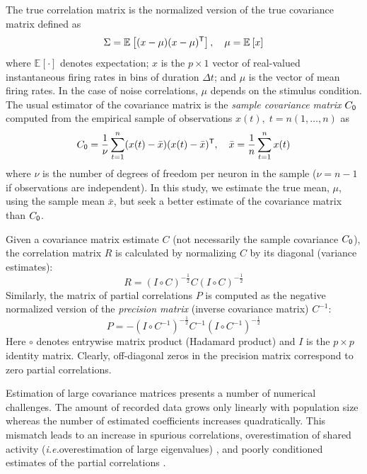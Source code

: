 \documentclass[10pt]{article}
\newcommand{\T}{{\sf T}}
\newcommand{\E}[2][]{\mathbb E_{#1}\left[ #2\right]}    %
\begin{document}
The true correlation matrix is the normalized version of the true covariance matrix defined as
\begin{equation}\label{eq:true-covariance}
    \Sigma = \E{(x-\mu)(x-\mu)^\T},\quad \mu = \E{x}
\end{equation}
where $\E{\cdot}$ denotes expectation; $x$ is the $p\times 1$ vector of real-valued instantaneous firing rates in bins of duration $\Delta t$; and $\mu$ is the vector of mean firing rates. In the case of noise correlations, $\mu$ depends on the stimulus condition.  The usual estimator of the covariance matrix is the \emph{sample covariance matrix} $C_{\sf 0}$ computed from the empirical sample of observations $x(t),\; t=n(1,\ldots,n)$ as
\begin{equation}
    C_{\sf 0} = \frac 1 \nu \sum\limits_{t=1}^n (x(t)-\bar x)(x(t)-\bar x)^\T,\quad \bar x= \frac 1 n \sum\limits_{t=1}^n x(t)
\end{equation}
where $\nu$ is the number of degrees of freedom per neuron in the sample ($\nu=n-1$ if observations are independent). In this study, we estimate the true mean, $\mu$,  using the sample mean $\bar x$, but seek a better estimate of the covariance matrix than $C_{\sf 0}$.

Given a covariance matrix estimate $C$ (not necessarily the sample covariance $C_{\sf 0}$), the correlation matrix $R$ is calculated by normalizing $C$ by its diagonal (variance estimates):
\begin{equation}\label{eq:precision}
    R = \left(I\circ C\right)^{-\frac 1 2} C \left(I\circ C\right)^{-\frac 1 2}
\end{equation}
Similarly, the matrix of partial correlations $P$ is computed as the negative normalized version of the \emph{precision matrix} (inverse covariance matrix) $C^{-1}$:
\begin{equation}\label{eq:partial}
    P = -\left(I\circ C^{-1}\right)^{-\frac 1 2} C^{-1} \left(I\circ C^{-1}\right)^{-\frac 1 2}
\end{equation}
Here $\circ$ denotes entrywise matrix product (Hadamard product) and $I$ is the $p\times p$ identity matrix. Clearly, off-diagonal zeros in the precision matrix correspond to zero partial correlations. 

Estimation of large covariance matrices presents a number of numerical challenges.  The amount of recorded data grows only linearly with population size whereas the number of estimated coefficients increases quadratically.  This mismatch leads to an increase in spurious correlations, overestimation of shared activity (\emph{i.e.}\;overestimation of large eigenvalues) \cite{Ledoit:2004}, and poorly conditioned estimates of the partial correlations \cite{Schafer:2005}.
\end{document}
